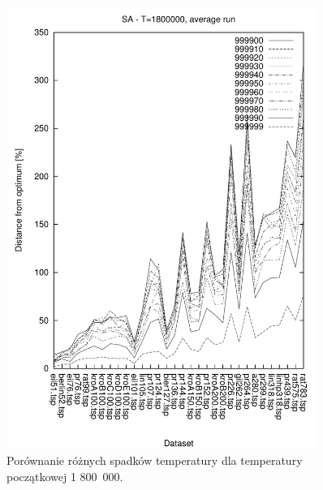 \begin{figure}
\begin{center}
\includegraphics[width=0.9\textwidth]{wykresy/sa/sa_1800000_av}
\end{center}
\caption{Porównanie różnych spadków temperatury dla temperatury początkowej 1 800~000.}
\label{sa_1800000_av}
\end{figure}

